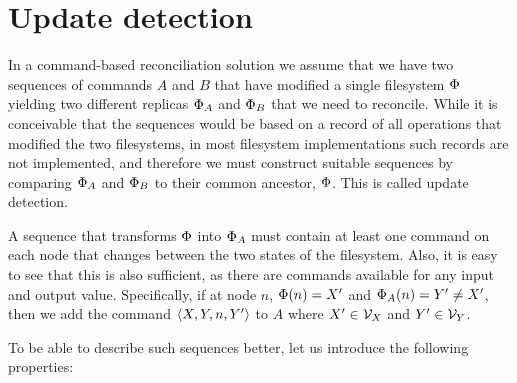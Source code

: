 \documentclass[12pt]{article}
\begin{document}









\section{Update detection}

In a command-based reconciliation solution we assume that we have two sequences of commands
$A$ and $B$ that have modified a single filesystem $\Phi$ yielding two different replicas $\Phi_A$ and $\Phi_B$ that we
need to reconcile. While it is conceivable that the sequences would be based on a record of
all operations that modified the two filesystems, in most filesystem implementations
such records are not implemented, and therefore we must construct suitable sequences
by comparing $\Phi_A$ and $\Phi_B$ to their common ancestor, $\Phi$. This is called update detection.

A sequence that transforms $\Phi$ into $\Phi_A$ must contain at least one command on each node
that changes between the two states of the filesystem. Also, it is easy to see that this is also
sufficient, as there are commands available for any input and output value. 
Specifically, if at node $n$, $\Phi(n)=X'$ and $\Phi_A(n)=Y'\neq X'$, then we add the command $\langle{X,Y,n,Y'}\rangle$ to $A$
where $X'\in\mathcal{V}_{X}$ and $Y'\in\mathcal{V}_{Y}$.

To be able to describe such sequences better, let us introduce the following properties:
\end{document}
